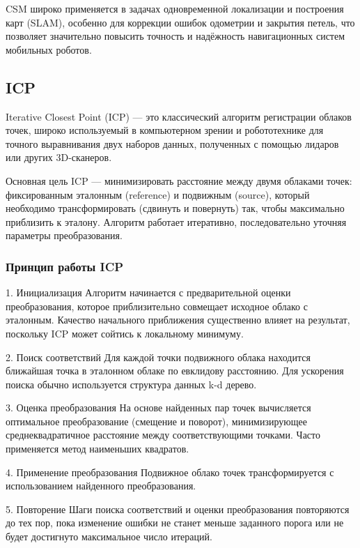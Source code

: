 CSM широко применяется в задачах одновременной локализации и построения карт (SLAM), особенно для коррекции ошибок одометрии и закрытия петель, что позволяет значительно повысить точность и надёжность навигационных систем мобильных роботов.


\subsection{ICP}

Iterative Closest Point (ICP) — это классический алгоритм регистрации облаков точек, широко используемый в компьютерном зрении и робототехнике для точного выравнивания двух наборов данных, полученных с помощью лидаров или других 3D-сканеров.

Основная цель ICP — минимизировать расстояние между двумя облаками точек: фиксированным эталонным (reference) и подвижным (source), который необходимо трансформировать (сдвинуть и повернуть) так, чтобы максимально приблизить к эталону. Алгоритм работает итеративно, последовательно уточняя параметры преобразования.

\subsubsection{Принцип работы ICP}

1. Инициализация  
    Алгоритм начинается с предварительной оценки преобразования, которое приблизительно совмещает исходное облако с эталонным. Качество начального приближения существенно влияет на результат, поскольку ICP может сойтись к локальному минимуму.
    
2. Поиск соответствий  
    Для каждой точки подвижного облака находится ближайшая точка в эталонном облаке по евклидову расстоянию. Для ускорения поиска обычно используется структура данных k-d дерево.
    
3. Оценка преобразования  
    На основе найденных пар точек вычисляется оптимальное преобразование (смещение и поворот), минимизирующее среднеквадратичное расстояние между соответствующими точками. Часто применяется метод наименьших квадратов.
    
4. Применение преобразования  
    Подвижное облако точек трансформируется с использованием найденного преобразования.
    
5. Повторение  
    Шаги поиска соответствий и оценки преобразования повторяются до тех пор, пока изменение ошибки не станет меньше заданного порога или не будет достигнуто максимальное число итераций.

